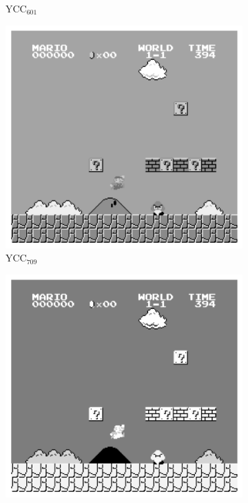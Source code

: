 \begin{figure}[ht]
\begin{subfigure}{.16\textwidth}
        \caption*{YCC$_{601}$}
    \end{subfigure}
    \hfill
    \begin{subfigure}{.16\textwidth}
        \centering
        \includegraphics*[width=\textwidth]{images/bw_comparison/ycc709.png}
        \caption*{YCC$_{709}$}
    \end{subfigure}
    \hfill
    \begin{subfigure}{.16\textwidth}
        \centering
        \includegraphics*[width=\textwidth]{images/bw_comparison/red_channel.png}

\end{subfigure}
\end{figure}
